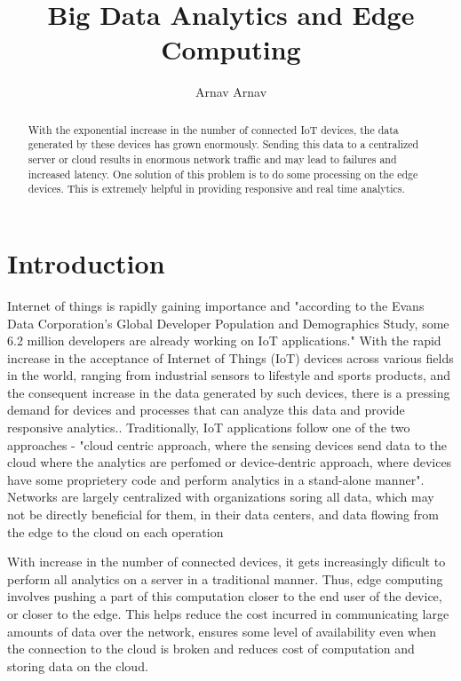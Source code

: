 \documentclass[sigconf]{acmart}
\begin{document}
\title{Big Data Analytics and Edge Computing}


\author{Arnav Arnav}

\begin{abstract}
With the exponential increase in the number of connected IoT devices, the data generated by these devices has grown enormously. Sending this data to a centralized server or cloud results in enormous network traffic and may lead to failures and increased latency. One solution of this problem is to do some processing on the edge devices. This is extremely helpful in providing responsive and real time analytics.
\end{abstract}

\maketitle
\section{Introduction}
Internet of things is rapidly gaining importance and "according to the Evans Data Corporation’s Global Developer Population and Demographics Study, some 6.2 million developers are already working on IoT applications."\cite{ibm_data_streaming_analytics} With the rapid increase in the acceptance of Internet of Things (IoT) devices across various fields in the world, ranging from industrial sensors to lifestyle and sports products, and the consequent increase in the data generated by such devices, there is a pressing demand for devices and processes that can analyze this data and provide responsive analytics.\cite{ieee_iot_cloud_analytics_newsletter}. Traditionally, IoT applications follow one of the two approaches - "cloud centric approach, where the sensing devices send data to the cloud where the analytics are perfomed or device-dentric approach, where devices have some proprietery code and perform analytics in a stand-alone manner"\cite{ieee_iot_cloud_analytics_newsletter}. Networks are largely centralized with  organizations soring all data, which may not be directly beneficial for them, in their data centers, and data flowing from the edge to the cloud on each operation\cite{ibm_iot_edge}

With increase in the number of connected devices, it gets increasingly dificult to perform  all analytics on a server in a traditional manner. Thus, edge computing involves pushing a part of this computation closer to the end user of the device, or closer to the edge\cite{wiki-edge-computing}\cite{ibm_iot_edge}. This helps reduce the cost incurred in communicating large amounts of data over the network, ensures some level of availability even when the connection to the cloud is broken and reduces cost of computation and storing data on the cloud\cite{ieee_iot_cloud_analytics_newsletter}.
\end{document}
